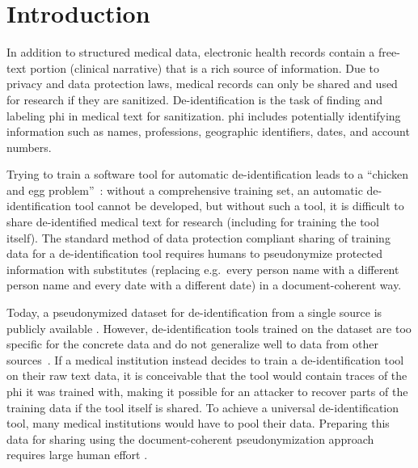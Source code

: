 
\section{Introduction}\label{sec:introduction}
%
In addition to structured medical data, electronic health records contain a free-text portion (clinical narrative) that is a rich source of information.
%
Due to privacy and data protection laws, medical records can only be shared and used for research if they are sanitized.
%
De-identification is the task of finding and labeling \ac{phi} in medical text for sanitization.
%
\Ac{phi} includes potentially identifying information such as names, professions, geographic identifiers, dates, and account numbers.


%
Trying to train a software tool for automatic de-identification leads to a ``chicken and egg problem''~\citep{uzuner2007evaluating}: without a comprehensive training set, an automatic de-identification tool cannot be developed, but without such a tool, it is difficult to share de-identified medical text for research (including for training the tool itself).
%
The standard method of data protection compliant sharing of training data for a de-identification tool requires humans to pseudonymize protected information with substitutes (replacing e.g.\ every person name with a different person name and every date with a different date) in a document-coherent way.

%
Today, a pseudonymized dataset for de-identification from a single source is publicly available \citep{stubbs2015annotating}.
%
However, de-identification tools trained on the dataset are too specific for the concrete data and do not generalize well to data from other sources~\citep{stubbs2017identification}.
%
If a medical institution instead decides to train a de-identification tool on their raw text data, it is conceivable that the tool would contain traces of the \ac{phi} it was trained with, making it possible for an attacker to recover parts of the training data if the tool itself is shared.
%
To achieve a universal de-identification tool, many medical institutions would have to pool their data.
%
Preparing this data for sharing using the document-coherent pseudonymization approach requires large human effort \citep{dernoncourt2017identification}.

